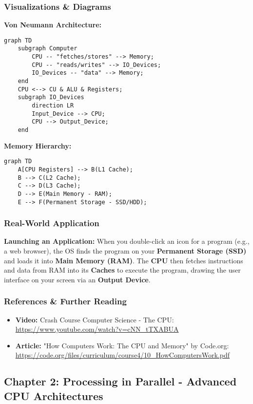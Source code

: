\documentclass{article}
\begin{document}
\subsubsection{Visualizations \& Diagrams}
\textbf{Von Neumann Architecture:}
\begin{verbatim}
graph TD
    subgraph Computer
        CPU -- "fetches/stores" --> Memory;
        CPU -- "reads/writes" --> IO_Devices;
        IO_Devices -- "data" --> Memory;
    end
    CPU <--> CU & ALU & Registers;
    subgraph IO_Devices
        direction LR
        Input_Device --> CPU;
        CPU --> Output_Device;
    end
\end{verbatim}

\textbf{Memory Hierarchy:}
\begin{verbatim}
graph TD
    A[CPU Registers] --> B(L1 Cache);
    B --> C(L2 Cache);
    C --> D(L3 Cache);
    D --> E(Main Memory - RAM);
    E --> F(Permanent Storage - SSD/HDD);
\end{verbatim}

\subsubsection{Real-World Application}
\textbf{Launching an Application:} When you double-click an icon for a program (e.g., a web browser), the OS finds the program on your \textbf{Permanent Storage (SSD)} and loads it into \textbf{Main Memory (RAM)}. The \textbf{CPU} then fetches instructions and data from RAM into its \textbf{Caches} to execute the program, drawing the user interface on your screen via an \textbf{Output Device}.

\subsubsection{References \& Further Reading}
\begin{itemize}
    \item \textbf{Video:} Crash Course Computer Science - The CPU: \url{https://www.youtube.com/watch?v=cNN_tTXABUA}
    \item \textbf{Article:} "How Computers Work: The CPU and Memory" by Code.org: \url{https://code.org/files/curriculum/course4/10_HowComputersWork.pdf}
\end{itemize}

\subsection{Chapter 2: Processing in Parallel - Advanced CPU Architectures}
\end{document}
